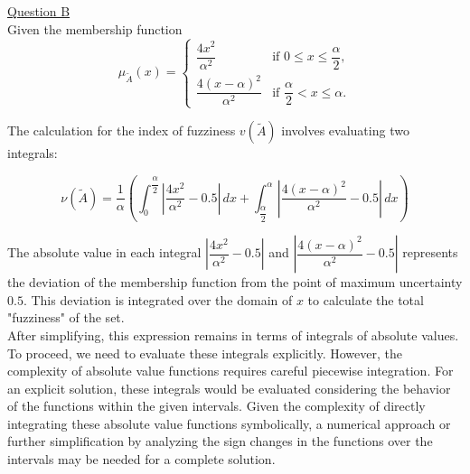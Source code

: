 \underline{Question B}\\
Given the membership function 
\begin{equation}
	\mu_{\tilde{A}}(x) = 
		 \begin{cases} 
		\displaystyle	\dfrac{4x^2}{\alpha^2} & \text{if } 0 \leq x \leq \dfrac{\alpha}{2}, \\
			
		\dfrac{4(x-\alpha)^2}{\alpha^2} & \text{if } \dfrac{\alpha}{2} < x \leq \alpha.
		\end{cases}
\end{equation}

The calculation for the index of fuzziness $v(\tilde{A})$ involves evaluating two integrals:

\begin{equation}
	\nu(\tilde{A}) = \dfrac{1}{\alpha} \left( \int_{0}^{\dfrac{\alpha}{2}} \left| \dfrac{4x^2}{\alpha^2} - 0.5 \right| \, dx + \int_{\dfrac{\alpha}{2}}^{\alpha} \left| \dfrac{4(x-\alpha)^2}{\alpha^2} - 0.5 \right| \, dx \right)
	\label{eq:main_eq}
\end{equation}

The absolute value in each integral $\left| \dfrac{4x^2}{\alpha^2} - 0.5 \right|$ and $\left| \dfrac{4(x-\alpha)^2}{\alpha^2} - 0.5 \right|$
represents the deviation of the membership function from the point of maximum uncertainty $0.5$. This deviation is integrated over the domain of $x$ to calculate the total "fuzziness" of the set.\\

After simplifying, this expression remains in terms of integrals of absolute values.
To proceed, we need to evaluate these integrals explicitly. However, the complexity of absolute value functions requires careful piecewise integration. For an explicit solution, these integrals would be evaluated considering the behavior of the functions within the given intervals. Given the complexity of directly integrating these absolute value functions symbolically, a numerical approach or further simplification by analyzing the sign changes in the functions over the intervals may be needed for a complete solution.\\

